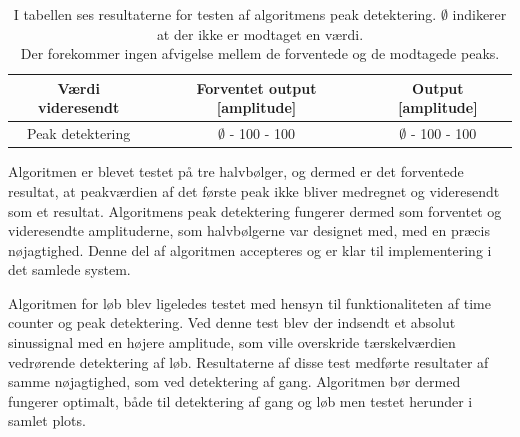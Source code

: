 \begin{table}[H]
	\centering
	\begin{tabular}{ccc}
		\hline
		\rowcolor[HTML]{C0C0C0} 
		Værdi videresendt & Forventet output [amplitude] & Output [amplitude] \\ \hline
		Peak detektering & $\emptyset$ - 100 - 100 & $\emptyset$ - 100 - 100 \\ \hline
	\end{tabular}
	\caption{I tabellen ses resultaterne for testen af algoritmens peak detektering. $\emptyset$ indikerer at der ikke er modtaget en værdi. \\ Der forekommer ingen afvigelse mellem de forventede og de modtagede peaks.}
	\label{tab:test_res_peak}
\end{table}\vspace{-0.5cm}
Algoritmen er blevet testet på tre halvbølger, og dermed er det forventede resultat, at peakværdien af det første peak ikke bliver medregnet og videresendt som et resultat. Algoritmens peak detektering fungerer dermed som forventet og videresendte amplituderne, som halvbølgerne var designet med, med en præcis nøjagtighed. Denne del af algoritmen accepteres og er klar til implementering i det samlede system.

Algoritmen for løb blev ligeledes testet med hensyn til funktionaliteten af time counter og peak detektering. Ved denne test blev der indsendt et absolut sinussignal med en højere amplitude, som ville overskride tærskelværdien vedrørende detektering af løb. Resultaterne af disse test medførte resultater af samme nøjagtighed, som ved detektering af gang. Algoritmen bør dermed fungerer optimalt, både til detektering af gang og løb men testet herunder i samlet plots.

